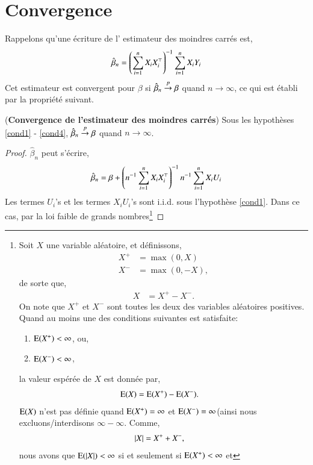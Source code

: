 \documentclass[10pt, reqno]{amsart}
\begin{document}
\section{Convergence}
Rappelons qu'une écriture de l' estimateur des moindres carrés est,
\begin{align*}
\hat{\beta}_n= \left(\sum_{i=1}^n X_iX_i^\top\right)^{-1}\sum_{i=1}^n X_iY_i
\end{align*}
Cet estimateur est convergent pour $\beta$ si $\hat{\beta}_n\overset{p}{\rightarrow} \beta$ quand $n\to \infty$, ce qui est établi par la propriété suivant.
\begin{propriete}(\textbf{Convergence de l'estimateur des moindres carrés})
Sous les hypothèses \ref{cond1} - \ref{cond4}, $\hat{\beta}_n\overset{p}{\rightarrow} \beta$ quand $n\to \infty$.
\end{propriete}
\begin{proof}
$\hat{\beta}_n$ peut s'écrire,
\begin{align}
\hat{\beta}_n= \beta +  \left(n^{-1}\sum_{i=1}^n X_iX_i^\top\right)^{-1}n^{-1}\sum_{i=1}^n X_iU_i
\label{eq1}
\end{align}
Les termes $U_i$'s et les termes $X_iU_i$'s sont i.i.d. sous l'hypothèse \ref{cond1}. 
Dans ce cas, par la loi faible de grands nombres\footnote{
Soit $X$ une variable aléatoire, et définissons, 
\begin{align*}
    X^{+} &=\max(0, X)\\ 
    X^{-} &=\max(0, -X),
\end{align*}
de sorte que, 
\begin{align*} 
    X &= X^{+} - X^{-}.
\end{align*}
On note que $X^{+}$ et $X^{-}$ sont toutes les deux des variables aléatoires positives. 
Quand au moins une des conditions suivantes est satisfaite: 
\begin{enumerate}[label = (\roman*)]
    \item $\operatorname{E}(X^{+}) < \infty$, ou,
    \item $\operatorname{E}(X^{-}) < \infty$,
\end{enumerate}
la valeur espérée de $X$ est donnée par, 
\begin{align*} 
    \operatorname{E}(X) &= \operatorname{E}(X^{+}) - \operatorname{E}(X^{-}).
\end{align*}
$\operatorname{E}(X)$ n'est pas définie quand  $\operatorname{E}(X^{+}) = \infty$ et $\operatorname{E}(X^{-})=\infty$(ainsi nous excluons/interdisons 
$\infty - \infty$. Comme, 
\begin{align*} 
    \left\vert {X} \right\vert &= X^{+}+ X^{-},
\end{align*}
nous avons que $\operatorname{E}(\left\vert {X} \right\vert)< \infty$ si et seulement si $\operatorname{E}(X^{+}) <\infty$ et
}
\end{proof}
\end{document}
